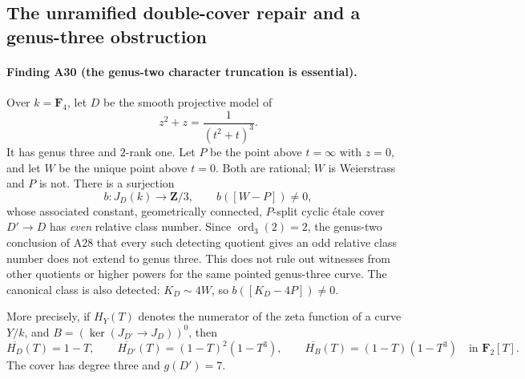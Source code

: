 \subsection{The unramified double-cover repair and a genus-three obstruction}
\label{sec:genus-three-pointing-counterexample}

\paragraph{Finding A30 (the genus-two character truncation is essential).}
Over $k=\mathbf F_4$, let $D$ be the smooth projective model of
\[
                   z^2+z=\frac{1}{(t^2+t)^3}.
\tag{DC.1}
\]
It has genus three and $2$-rank one.  Let $P$ be the point
above $t=\infty$ with $z=0$, and let $W$ be the unique point
above $t=0$.  Both are rational; $W$ is Weierstrass and $P$
is not.  There is a surjection
\[
            b:J_D(k)\longrightarrow\mathbf Z/3,
                 \qquad b([W-P])\ne0,
\tag{DC.2}
\]
whose associated constant, geometrically connected, $P$-split
cyclic \'etale cover $D'\to D$ has \emph{even} relative class
number.  Since $\operatorname{ord}_3(2)=2$, the genus-two
conclusion of A28 that every such detecting quotient gives
an odd relative class number does not extend to genus three.
This does not rule out witnesses from other quotients or
higher powers for the same pointed genus-three curve.
The canonical class is also
detected: $K_D\sim4W$, so $b([K_D-4P])\ne0$.

More precisely, if $H_Y(T)$ denotes the numerator of the zeta
function of a curve $Y/k$, and
$B=(\ker(J_{D'}\to J_D))^0$, then
\[
 \overline{H_D}(T)=1-T,\qquad
 \overline{H_{D'}}(T)=(1-T)^2(1-T^3),\qquad
 \overline{H_B}(T)=(1-T)(1-T^3)
                         \quad\text{in }\mathbf F_2[T].
\tag{DC.3}
\]
The cover has degree three and $g(D')=7$.

